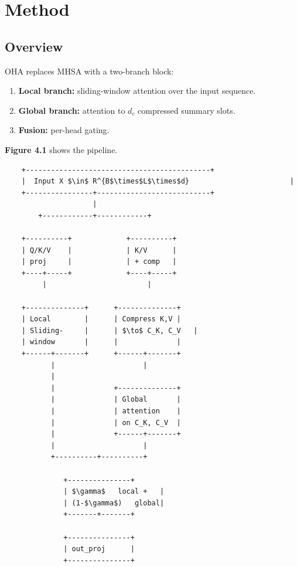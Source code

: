 
\section{Method}

\subsection{Overview}

OHA replaces MHSA with a two-branch block:

\begin{enumerate}
\item \textbf{Local branch:} sliding-window attention over the input sequence.
\item \textbf{Global branch:} attention to $d_c$ compressed summary slots.
\item \textbf{Fusion:} per-head gating.

\end{enumerate}
\textbf{Figure 4.1} shows the pipeline.

\begin{lstlisting}
    +--------------------------------------------+
    |  Input X $\in$ R^{B$\times$L$\times$d}                        |
    +----------------+---------------------------+
                     |
        +------------+------------+
                                   
    +----------+             +----------+
    | Q/K/V    |             | K/V      |
    | proj     |             | + comp   |
    +----+-----+             +----+-----+
         |                        |
                                   
    +--------------+      +--------------+
    | Local        |      | Compress K,V |
    | Sliding-     |      | $\to$ C_K, C_V   |
    | window       |      |              |
    +------+-------+      +------+-------+
           |                     |
           |                      
           |              +--------------+
           |              | Global       |
           |              | attention    |
           |              | on C_K, C_V  |
           |              +------+-------+
           |                     |
           +----------+----------+
                       
              +---------------+
              | $\gamma$   local +   |
              | (1-$\gamma$)   global|
              +-------+-------+
                       
              +---------------+
              | out_proj      |
              +---------------+
\end{lstlisting}

